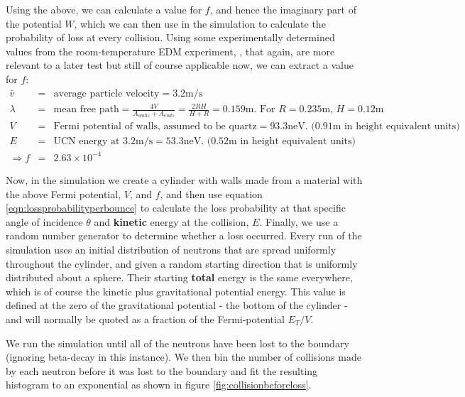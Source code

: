 \documentclass[11pt,a4paper,oneside]{article}
\begin{document}
Using the above, we can calculate a value for $f$, and hence the imaginary part of the potential $W$, which we can then use in the simulation to calculate the probability of loss at every collision. Using some experimentally determined values from the room-temperature EDM experiment, \cite{Pe.09}, that again, are more relevant to a later test but still of course applicable now, we can extract a value for $f$:
\begin{eqnarray*}
\bar{v} &=& \mbox{average particle velocity} = 3.2 \mbox{m/s} \\
\lambda &=& \mbox{mean free path} = \frac{4V}{A_{walls} + A_{ends}} = \frac{2RH}{H+R} = 0.159 \mbox{m.  For $R = 0.235$m, $H = 0.12$m} \\
V &=& \mbox{Fermi potential of walls, assumed to be quartz} = 93.3 \mbox{neV.    (0.91m in height equivalent units)} \\
E &=& \mbox{UCN energy at 3.2m/s} = 53.3 \mbox{neV.     (0.52m in height equivalent units)} \\
\Rightarrow f &=& 2.63\times10^{-4}
\end{eqnarray*}

Now, in the simulation we create a cylinder with walls made from a material with the above Fermi potential, $V$, and $f$, and then use equation \ref{eqn:lossprobabilityperbounce} to calculate the loss probability at that specific angle of incidence $\theta$ and \textbf{kinetic} energy at the collision, $E$. Finally, we use a random number generator to determine whether a loss occurred. Every run of the simulation uses an initial distribution of neutrons that are spread uniformly throughout the cylinder, and given a random starting direction that is uniformly distributed about a sphere. Their starting \textbf{total} energy is the same everywhere, which is of course the kinetic plus gravitational potential energy. This value is defined at the zero of the gravitational potential - the bottom of the cylinder - and will normally be quoted as a fraction of the Fermi-potential $E_{T}/V$.

We run the simulation until all of the neutrons have been lost to the boundary (ignoring beta-decay in this instance). We then bin the number of collisions made by each neutron before it was lost to the boundary and fit the resulting histogram to an exponential as shown in figure \ref{fig:collisionbeforeloss}. 
\end{document}
